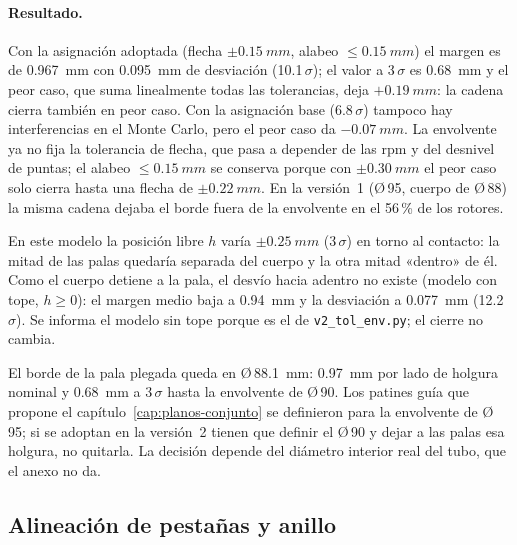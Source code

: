 \paragraph{Resultado.} Con la asignación adoptada (flecha $\pm\SI{0.15}{mm}$, alabeo
$\le\SI{0.15}{mm}$) el margen es de \SI{0.967}{mm} con \SI{0.095}{mm} de desviación (\num{10.1}\,$\sigma$);
el valor a 3\,$\sigma$ es \SI{0.68}{mm} y el peor caso, que suma linealmente todas las tolerancias, deja
$+\SI{0.19}{mm}$: la cadena cierra también en peor caso. Con la asignación base (\num{6.8}\,$\sigma$)
tampoco hay interferencias en el Monte Carlo, pero el peor caso da $-\SI{0.07}{mm}$. La envolvente ya no
fija la tolerancia de flecha, que pasa a depender de las rpm y del desnivel de puntas; el alabeo
$\le\SI{0.15}{mm}$ se conserva porque con $\pm\SI{0.30}{mm}$ el peor caso solo cierra hasta una flecha de
$\pm\SI{0.22}{mm}$. En la versión~1 (Ø\,95, cuerpo de Ø\,88) la misma cadena dejaba el borde fuera de la
envolvente en el 56\,\% de los rotores.

En este modelo la posición libre $h$ varía $\pm\SI{0.25}{mm}$ ($3\,\sigma$) en torno al contacto: la
mitad de las palas quedaría separada del cuerpo y la otra mitad «dentro» de él. Como el cuerpo detiene a la
pala, el desvío hacia adentro no existe (modelo con tope, $h\ge0$): el margen medio baja a
\SI{0.94}{mm} y la desviación a \SI{0.077}{mm} (\num{12.2}\,$\sigma$). Se informa el modelo sin tope porque
es el de \texttt{v2\_tol\_env.py}; el cierre no cambia.

\begin{nota}
El borde de la pala plegada queda en Ø\,\SI{88.1}{mm}: \SI{0.97}{mm} por lado de holgura nominal y
\SI{0.68}{mm} a $3\,\sigma$ hasta la envolvente de Ø\,90. Los patines guía que propone el
capítulo~\ref{cap:planos-conjunto} se definieron para la envolvente de Ø\,95; si se adoptan en la
versión~2 tienen que definir el Ø\,90 y dejar a las palas esa holgura, no quitarla. La decisión depende
del diámetro interior real del tubo, que el anexo no da.
\end{nota}

\subsection{Alineación de pestañas y anillo}


